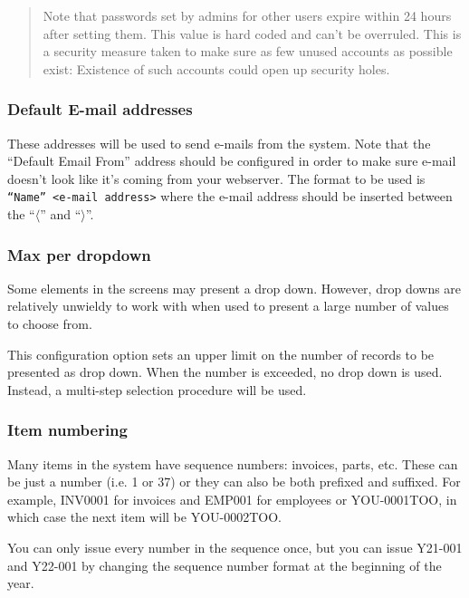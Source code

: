\begin{quote}
Note that passwords set by admins for other users expire  within 24 hours after setting them.
This value is hard coded and can't be overruled. This is a security measure taken to make
sure as few unused accounts as possible exist: Existence of such accounts could open up security
holes.
\end{quote}


\subsubsection{Default E-mail addresses}
\label{subsubsec-company-config-defaults-email}

These addresses will be used to send e-mails  from the system.
Note that the ``Default Email From'' address should be configured in order to make sure
e-mail doesn't look like it's coming from your webserver. The format to be used is \texttt{``Name'' <e-mail address>} where the e-mail address should be inserted between the
``$\langle$'' and ``$\rangle$''.

\subsubsection{Max per dropdown}
\label{subsubsec-company-config-defaults-max-dropdown}

Some elements in the screens may present a drop down. However, drop downs are
relatively unwieldy to work with when used to present a large number of values
to choose from.

This configuration option sets an upper limit on the number of records to be
presented as drop down.  When the number is exceeded, no drop down is used.  Instead,
a multi-step selection procedure will be used.

\subsubsection{Item numbering}
\label{subsubsec-company-config-defaults-item-numbers}

Many items in the system have sequence numbers: invoices, parts, etc.
These  can be just a number (i.e. 1 or 37) or
they can also be both prefixed and suffixed. For example, INV0001 for invoices and EMP001 for employees or YOU-0001TOO, in which case the next item will be YOU-0002TOO. 

You can only issue every number in the sequence once, but you can issue Y21-001 and Y22-001 by changing the sequence number format at the beginning of the year.

